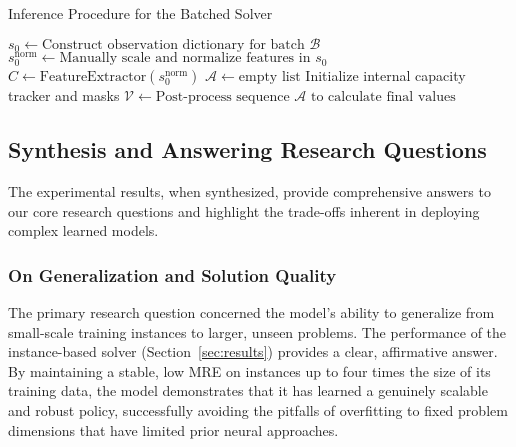 \begin{algorithm}[htbp]
    \caption{Inference Procedure for the Batched Solver}
    \label{alg:batch_solver}
    \BlankLine
    $s_0 \leftarrow \text{Construct observation dictionary for batch } \mathcal{B}$\;
    $s_0^{\text{norm}} \leftarrow \text{Manually scale and normalize features in } s_0$\;
    $C \leftarrow \mathrm{FeatureExtractor}(s_0^{\text{norm}})$\;
    \BlankLine
    $\mathcal{A} \leftarrow \text{empty list}$\;
    Initialize internal capacity tracker and masks\;
    \BlankLine
    \BlankLine
    $\mathcal{V} \leftarrow \text{Post-process sequence } \mathcal{A} \text{ to calculate final values}$\;
    \;
\end{algorithm}

\subsection{Synthesis and Answering Research Questions}
The experimental results, when synthesized, provide comprehensive answers to our core research questions and highlight the trade-offs inherent in deploying complex learned models.

\subsubsection{On Generalization and Solution Quality}
The primary research question concerned the model's ability to generalize from small-scale training instances to larger, unseen problems. The performance of the instance-based solver (Section~\ref{sec:results}) provides a clear, affirmative answer. By maintaining a stable, low MRE on instances up to four times the size of its training data, the model demonstrates that it has learned a genuinely scalable and robust policy, successfully avoiding the pitfalls of overfitting to fixed problem dimensions that have limited prior neural approaches.

